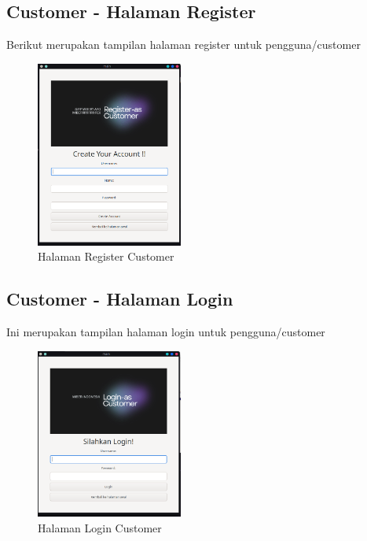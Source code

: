 \documentclass[a4paper,12pt]{article}
\begin{document}
\subsection{Customer - Halaman Register}
Berikut merupakan tampilan halaman register untuk pengguna/customer
\begin{figure}[!htbp]
    \centering
    \includegraphics[width=0.43\textwidth]{./Register.png}
    \caption{Halaman Register Customer}

\end{figure}
\FloatBarrier 

\subsection{Customer - Halaman Login}
Ini merupakan tampilan halaman login untuk pengguna/customer
\begin{figure}[!htbp]
    \centering
    \includegraphics[width=0.43\textwidth]{./Login.png}
    \caption{Halaman Login Customer}

\end{figure}
\FloatBarrier 
\end{document}
